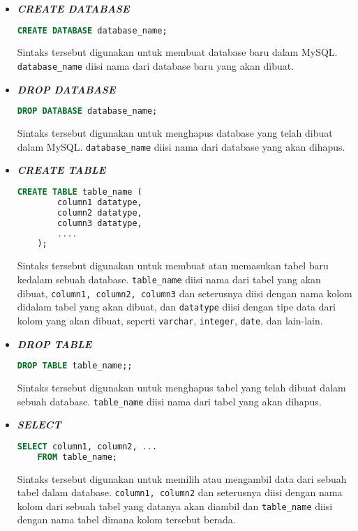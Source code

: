 \begin{itemize}
    \item \textbf{\textit{CREATE DATABASE}}
    \begin{lstlisting}[language=SQL]
    CREATE DATABASE database_name;
    \end{lstlisting}
    Sintaks tersebut digunakan untuk membuat database baru dalam MySQL. \texttt{database\_name} diisi nama dari database baru yang akan dibuat.
    \item \textbf{\textit{DROP DATABASE}}
    \begin{lstlisting}[language=SQL]
    DROP DATABASE database_name;
    \end{lstlisting}
    Sintaks tersebut digunakan untuk menghapus database yang telah dibuat dalam MySQL. \texttt{database\_name} diisi nama dari database yang akan dihapus.
    
    \item \textbf{\textit{CREATE TABLE}}
    \begin{lstlisting}[language=SQL]
    CREATE TABLE table_name (
        column1 datatype,
        column2 datatype,
        column3 datatype,
        ....
    );
    \end{lstlisting}
    Sintaks tersebut digunakan untuk membuat atau memasukan tabel baru kedalam sebuah database. \texttt{table\_name} diisi nama dari tabel yang akan dibuat, \texttt{column1, column2, column3} dan seterusnya diisi dengan nama kolom didalam tabel yang akan dibuat, dan \texttt{datatype} diisi dengan tipe data dari kolom yang akan dibuat, seperti \texttt{varchar}, \texttt{integer}, \texttt{date}, dan lain-lain.

    \item \textbf{\textit{DROP TABLE}}
    \begin{lstlisting}[language=SQL]
    DROP TABLE table_name;;
    \end{lstlisting}
    Sintaks tersebut digunakan untuk menghapus tabel yang telah dibuat dalam sebuah database. \texttt{table\_name} diisi nama dari tabel yang akan dihapus.

    \item \textbf{\textit{SELECT}}
    \begin{lstlisting}[language=SQL]
    SELECT column1, column2, ...
    FROM table_name;
    \end{lstlisting}
    Sintaks tersebut digunakan untuk memilih atau mengambil data dari sebuah tabel dalam database. \texttt{column1, column2} dan seterusnya diisi dengan nama kolom dari sebuah tabel yang datanya akan diambil dan \texttt{table\_name} diisi dengan nama tabel dimana kolom tersebut berada.


\end{itemize}
